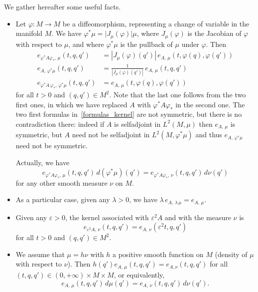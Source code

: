 \documentclass[AHL,Unicode,published]{cedram}
\begin{document}
We gather hereafter some useful facts.
\begin{itemize}
\item Let $\varphi:M\rightarrow M$ be a diffeomorphism, representing a change of variable in the manifold $M$. We have $\varphi^*\mu = \vert J_\mu(\varphi)\vert\mu$, where $J_\mu(\varphi)$ is the Jacobian of $\varphi$ with respect to $\mu$, and where $\varphi^*\mu$ is the pullback of $\mu$ under $\varphi$. Then
\begin{equation}\label{formulas_kernel}
\begin{split}
e_{\varphi^*A\varphi_*,\,\mu}(t,q,q') &= \left\vert J_\mu(\varphi)(q')\right\vert\, e_{A,\,\mu}(t,\varphi(q),\varphi(q')) \\
e_{A,\,\varphi^*\mu}(t,q,q') &= \frac{1}{\left\vert J_\mu(\varphi)(q')\right\vert}\, e_{A,\,\mu}(t,q,q') \\
e_{\varphi^*A\,\varphi_*,\,\varphi^*\mu}(t,q,q') &= e_{A,\,\mu}\left(t,\varphi(q),\varphi(q')\right)
\end{split}
\end{equation}
for all $t>0$ and $(q,q')\in M^2$. Note that the last one follows from the two first ones, in which we have replaced $A$ with $\varphi^*A\varphi_*$ in the second one. The two first formulas in~\eqref{formulas_kernel} are not symmetric, but there is no contradiction there: indeed if $A$ is selfadjoint in $L^2(M,\mu)$ then $e_{A,\,\mu}$ is symmetric, but $A$ need not be selfadjoint in $L^2(M,\varphi^*\mu)$ and thus $e_{A,\,\varphi^*\mu}$ need not be symmetric.

Actually, we have
\[
e_{\varphi^*A\varphi_*,\,\mu}(t,q,q')\, d(\varphi^*\mu)(q') = e_{\varphi^*A\varphi_*,\,\nu}(t,q,q')\, d\nu(q')
\]
for any other smooth measure $\nu$ on $M$.

\item As a particular case, given any $\lambda>0$, we have $\lambda\, e_{A,\,\lambda\,\mu} = e_{A,\,\mu} $.

\item Given any $\varepsilon>0$, the kernel associated with $\varepsilon^2 A$ and with the measure $\nu$ is
\begin{equation*}
e_{\varepsilon^2 A,\, \nu}(t,q,q') = e_{A,\,\nu}(\varepsilon^2 t,q,q')
\end{equation*}
for all $t>0$ and $(q,q')\in M^2$.


\item We assume that $\mu=h\nu$ with $h$ a positive smooth function on $M$ (density of $\mu$ with respect to $\nu$). Then $h(q')e_{A,\,\mu}(t,q,q')=e_{A,\nu}(t,q,q')$ for all $(t,q,q')\in(0,+\infty)\times M\times M$, or equivalently,
\begin{equation}\label{kernel_change_measure}
e_{A,\,\mu}(t,q,q')\, d\mu(q') = e_{A,\,\nu}(t,q,q')\, d\nu(q').
\end{equation}
\end{itemize}
\end{document}
